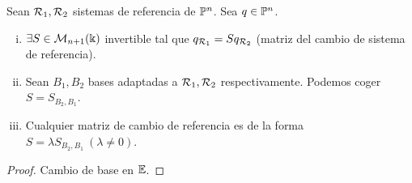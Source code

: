 \begin{prop}
    Sean $\mathcal{R}_1, \mathcal{R}_2$ sistemas de referencia de $\mathbb{P}^n$. Sea $q \in \mathbb{P}^n$.
    \begin{enumerate}[i)]
        \item $\exists S \in \mathcal{M}_{n+1}(\Bbbk)$ invertible tal que $q_{\mathcal{R}_1} = S q_{\mathcal{R}_2}$
        (matriz del cambio de sistema de referencia).
        \item Sean $B_1, B_2$ bases adaptadas a $\mathcal{R}_1, \mathcal{R}_2$ respectivamente. Podemos coger $S=S_{B_2, B_1}$.
        \item Cualquier matriz de cambio de referencia es de la forma $S=\lambda S_{B_2, B_1} \ (\lambda \neq 0)$.
    \end{enumerate}
\end{prop}
\begin{proof}
    Cambio de base en $\mathbb{E}$.
\end{proof}
